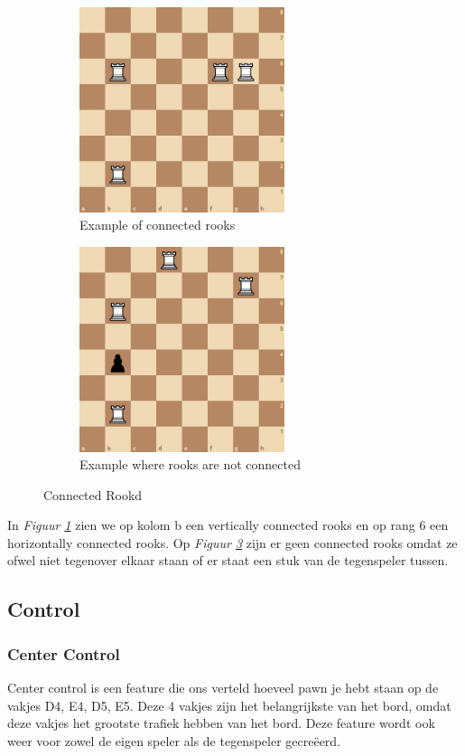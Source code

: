 \documentclass[a4paper,openany]{uantwerpenassignment}
\newcommand{\figref}[1]{\textit{Figuur \ref{#1}}}
\begin{document}
\begin{figure}[h]
    \centering
    \begin{subfigure}{.4\textwidth}
        \includegraphics[width=170pt]{images/ConnectedRooks.png}
        \caption{Example of connected rooks}
        \label{fig:ConnectedRooks}
    \end{subfigure}
    \begin{subfigure}{.4\textwidth}
        \includegraphics[width=170pt]{images/NotConnectedRooks.png}
        \caption{Example where rooks are not connected}
        \label{fig:NotConnectedRooks}
    \end{subfigure}
    \caption{Connected Rookd}
\end{figure}

In \figref{fig:ConnectedRooks} zien we op kolom b een vertically connected rooks en op rang 6 een horizontally connected rooks. Op \figref{fig:NotConnectedRooks} zijn er geen connected rooks omdat ze ofwel niet tegenover elkaar staan of er staat een stuk van de tegenspeler tussen.

\subsection{Control}
\subsubsection{Center Control}
Center control is een feature die ons verteld hoeveel pawn je hebt staan op de vakjes D4, E4, D5, E5. Deze 4 vakjes zijn het belangrijkste van het bord, omdat deze vakjes het grootste trafiek hebben van het bord.
Deze feature wordt ook weer voor zowel de eigen speler als de tegenspeler gecreëerd.
\end{document}

